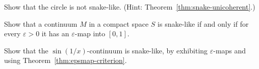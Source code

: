 \begin{exercise}
Show that the circle is not snake-like. (Hint: Theorem~\ref{thm:snake-unicoherent}.)
\end{exercise}

\begin{exercise}
Show that a continuum $M$ in a compact space $S$ is snake-like if and only if for every
$\varepsilon>0$ it has an $\varepsilon$-map into $[0,1]$.
\end{exercise}

\begin{exercise}
Show that the $\sin(1/x)$-continuum is snake-like, by exhibiting $\varepsilon$-maps and using
Theorem~\ref{thm:epsmap-criterion}.
\end{exercise}
